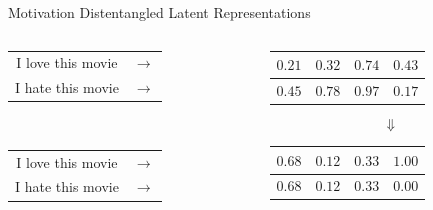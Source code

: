 \documentclass{beamer}
\begin{document}
\begin{frame}{Motivation}
	\centering
	{\Large Distentangled Latent Representations} \\
	\vspace{1cm}
	\begin{columns}[T] %
		\begin{column}{.3\textwidth}
			\centering
			\begin{tabular}{ c c }
				I love this movie & $\rightarrow$ \\
				I hate this movie & $\rightarrow$ \\
			\end{tabular}\\
			\vspace{1.8cm}
			\begin{tabular}{ c c }
				I love this movie & $\rightarrow$ \\
				I hate this movie & $\rightarrow$ \\
			\end{tabular}
		\end{column}
		\hfill
		\begin{column}{.6\textwidth}
			\centering
			\begin{tabular}{ | c | c | c | c | }
				\hline
				$0.21$ & $0.32$ & $0.74$ & $0.43$ \\
				\hline
				\hline
				$0.45$ & $0.78$ & $0.97$ & $0.17$ \\
				\hline
			\end{tabular}
			{\Huge$$\Downarrow$$}
			\begin{tabular}{ | c | c | c | c | }
				\hline
				$0.68$ & $0.12$ & $0.33$ & {\color{red}$1.00$} \\
				\hline
				\hline
				$0.68$ & $0.12$ & $0.33$ & {\color{red}$0.00$} \\
				\hline
			\end{tabular}
		\end{column}
	\end{columns}
\end{frame}
\end{document}
